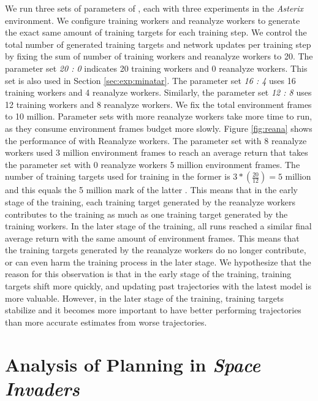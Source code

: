 We run three sets of parameters of \moozi, each with three experiments in the \textit{Asterix} environment.
We configure training workers and reanalyze workers to generate the exact same amount of training targets for each training step.
We control the total number of generated training targets and network updates per training step by fixing the sum of number of training workers and reanalyze workers to 20.
The parameter set \textit{20 : 0} indicates 20 training workers and 0 reanalyze workers.
This set is also used in Section \ref{sec:exp:minatar}.
The parameter set \textit{16 : 4} uses 16 training workers and 4 reanalyze workers.
Similarly, the parameter set \textit{12 : 8} uses 12 training workers and 8 reanalyze workers.
We fix the total environment frames to 10 million.
Parameter sets with more reanalyze workers take more time to run, as they consume environment frames budget more slowly.
Figure \ref{fig:reana} shows the performance of \moozi with Reanalyze workers.
The parameter set with 8 reanalyze workers used 3 million environment frames to reach an average return that takes the parameter set with 0 reanalyze workers 5 million environment frames.
The number of training targets used for training in the former is $3 * (\frac{20}{12}) = 5$ million and this equals the 5 million mark of the latter .
This means that in the early stage of the training, each training target generated by the reanalyze workers contributes to the training as much as one training target generated by the training workers.
In the later stage of the training, all runs reached a similar final average return with the same amount of environment frames.
This means that the training targets generated by the reanalyze workers do no longer contribute, or can even harm the training process in the later stage.
We hypothesize that the reason for this observation is that in the early stage of the training, training targets shift more quickly, and updating past trajectories with the latest model is more valuable.
However, in the later stage of the training, training targets stabilize and it becomes more important to have better performing trajectories than more accurate estimates from worse trajectories.

\section{Analysis of Planning in \textit{Space Invaders}} \label{sec:exp:plan_space_invaders}

